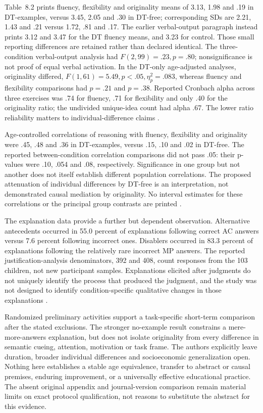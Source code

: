 Table~8.2 prints fluency, flexibility and originality means of
3.13, 1.98 and .19 in DT-examples, versus 3.45, 2.05 and .30 in
DT-free; corresponding SDs are 2.21, 1.43 and .21 versus 1.72,
.81 and .17. The earlier verbal-output paragraph instead prints 3.12
and 3.47 for the DT fluency means, and 3.23 for control. Those small
reporting differences are retained rather than declared identical.
The three-condition verbal-output analysis had \(F(2,99)=.23,p=.80\);
nonsignificance is not proof of equal verbal activation. In the DT-only
age-adjusted analyses, originality differed,
\(F(1,61)=5.49,p<.05,\eta_p^2=.083\), whereas fluency and flexibility
comparisons had \(p=.21\) and \(p=.38\). Reported Cronbach alpha across
three exercises was .74 for fluency, .71 for flexibility and only .40 for
the originality ratio; the undivided unique-idea count had alpha .67.
The lower ratio reliability matters to individual-difference claims
\cite[pp.~116--120, table~8.2]{DeChantal2021ThesisSelectedStudy}.

Age-controlled correlations of reasoning with fluency, flexibility and
originality were .45, .48 and .36 in DT-examples, versus .15, .10 and
.02 in DT-free. The reported between-condition correlation comparisons
did not pass .05: their p-values were .10, .054 and .08, respectively.
Significance in one group but not another does not itself establish different
population correlations. The proposed attenuation of individual differences
by DT-free is an interpretation, not demonstrated causal mediation by
originality. No interval estimates for these correlations or the principal
group contrasts are printed
\cite[pp.~120--126, table~8.3]{DeChantal2021ThesisSelectedStudy}.

The explanation data provide a further but dependent observation. Alternative
antecedents occurred in 55.0 percent of explanations following correct AC
answers versus 7.6 percent following incorrect ones. Disablers occurred in
83.3 percent of explanations following the relatively rare incorrect MP
answers. The reported justification-analysis denominators, 392 and 408,
count responses from the 103 children, not new participant samples.
Explanations elicited after judgments do not uniquely identify the process
that produced the judgment, and the study was not designed to identify
condition-specific qualitative changes in those explanations
\cite[pp.~114--116,125]{DeChantal2021ThesisSelectedStudy}.

Randomized preliminary activities support a task-specific short-term
comparison after the stated exclusions. The stronger no-example result
constrains a mere-more-answers explanation, but does not isolate originality
from every difference in semantic cueing, attention, motivation or task frame.
The authors explicitly leave duration, broader individual differences and
socioeconomic generalization open. Nothing here establishes a stable age
equivalence, transfer to abstract or causal premises, enduring improvement,
or a universally effective educational practice. The absent original appendix
and journal-version comparison remain material limits on exact protocol
qualification, not reasons to substitute the abstract for this evidence.

